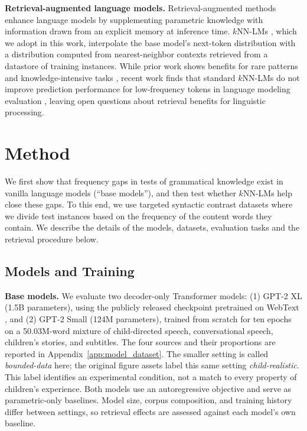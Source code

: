\noindent \textbf{Retrieval-augmented language models.}  
Retrieval-augmented methods enhance language models by supplementing parametric knowledge with information drawn from an explicit memory at inference time. $k$NN-LMs \citep{khandelwal2020knnlm}, which we adopt in this work, interpolate the base model's next-token distribution with a distribution computed from nearest-neighbor contexts retrieved from a datastore of training instances. While prior work shows benefits for rare patterns and knowledge-intensive tasks \citep{borgeaud2022improving,kandpal2023large,mallen2023trust}, recent work finds that standard $k$NN-LMs do not improve prediction performance for low-frequency tokens in language modeling evaluation \citep{nishida2025long}, leaving open questions about retrieval benefits for linguistic processing.



\section{Method}
\label{sec:method}

We first show that frequency gaps in tests of grammatical knowledge exist in vanilla language models (``base models''), and then test whether $k$NN-LMs help close these gaps. To this end, we use targeted syntactic contrast datasets where we divide test instances based on the frequency of the content words they contain. We describe the details of the models, datasets, evaluation tasks and the retrieval procedure below. 

\subsection{Models and Training}

\noindent \textbf{Base models.} We evaluate two decoder-only Transformer models: (1) GPT-2 XL (1.5B parameters), using the publicly released checkpoint pretrained on WebText \citep{radford2019language}, and (2) GPT-2 Small (124M parameters), trained from scratch for ten epochs on a 50.03M-word mixture of child-directed speech, conversational speech, children's stories, and subtitles. The four sources and their proportions are reported in Appendix~\ref{app:model_dataset}. The smaller setting is called \emph{bounded-data} here; the original figure assets label this same setting \emph{child-realistic}. This label identifies an experimental condition, not a match to every property of children's experience. Both models use an autoregressive objective and serve as parametric-only baselines. Model size, corpus composition, and training history differ between settings, so retrieval effects are assessed against each model's own baseline.


